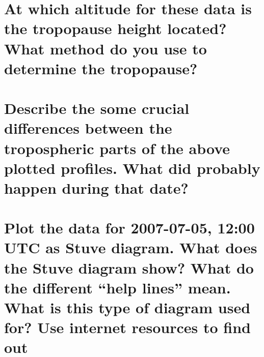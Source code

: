 \documentclass{article}
\begin{document}
\newpage
\section{At which altitude for these data is the tropopause height located?What method do you use to determine the tropopause?}


\newpage
\section{Describe the some crucial differences between the tropospheric parts of the above plotted profiles. What did probably happen during that date?}



\newpage
\section{Plot the data for 2007-07-05, 12:00 UTC as Stuve diagram. What does the Stuve diagram show? What do the different “help lines” mean. What is this type of diagram used for? Use internet resources to find out}
\end{document}
